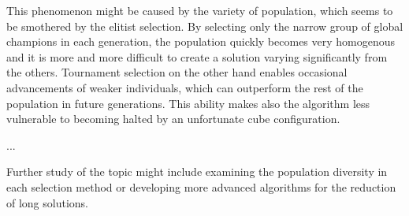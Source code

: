 \documentclass[a4paper]{article}
\begin{document}
This phenomenon might be caused by the variety of population, which seems to be smothered by the elitist selection. By selecting only the narrow group of global champions in each generation, the population quickly becomes very homogenous and it is more and more difficult to create a solution varying significantly from the others. Tournament selection on the other hand enables occasional advancements of weaker individuals, which can outperform the rest of the population in future generations. This ability makes also the algorithm less vulnerable to becoming halted by an unfortunate cube configuration.

... 

Further study of the topic might include examining the population diversity in each selection method or developing more advanced algorithms for the reduction of long solutions.
\end{document}
